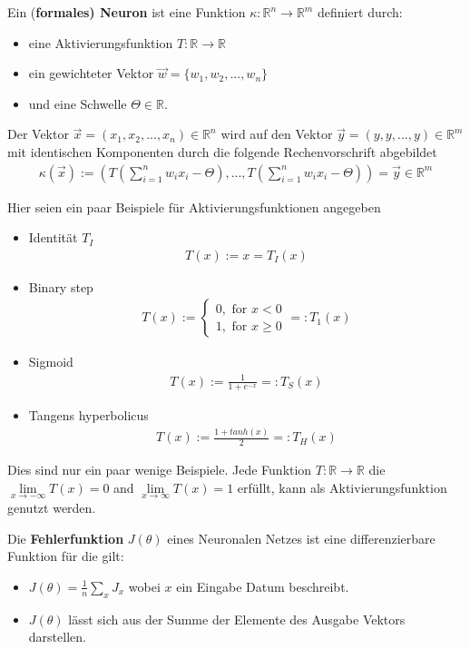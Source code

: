 \begin{definition} \label{Def:formales Neuron}
\cite[Kapitel 1.2]{BurkhardLenze.1997} Ein (\textbf{formales) Neuron} ist eine Funktion $\kappa: \mathbb{R}^n \rightarrow \mathbb{R}^m$ definiert durch:
\begin{itemize}
\item eine Aktivierungsfunktion $T:\mathbb{R} \rightarrow \mathbb{R}$
\item ein gewichteter Vektor $\vec{w} = \{w_1,w_2,...,w_n\}$
\item und eine Schwelle  $\Theta\in\mathbb{R}$.
\end{itemize}
Der Vektor $\vec{x} = (x_1,x_2,...,x_n)\in \mathbb{R}^n$ wird auf den Vektor $\vec{y} = (y,y,...,y)\in \mathbb{R}^m$ mit identischen Komponenten durch die folgende Rechenvorschrift abgebildet
\begin{align}
\kappa(\vec{x}):= (T(\sum\limits_{i=1}^n w_i x_i - \Theta),...,T(\sum\limits_{i=1}^n w_i x_i - \Theta))=\vec{y} \in \mathbb{R}^m
\end{align}   
\end{definition}
Hier seien ein paar Beispiele für Aktivierungsfunktionen angegeben
\begin{itemize}
\item Identität $T_I$
\begin{align*}
T(x):=x=T_I(x)
\end{align*}
\item Binary step
\begin{align*}
T(x) := \begin{cases} 0, \text{ for } x < 0 \\ 1, \text{ for } x \geq 0 \end{cases} =: T_1 (x)
\end{align*}
\item Sigmoid
\begin{align*}
T(x) := \frac{1}{1+e^{-x}} =: T_S(x)
\end{align*}
\item Tangens hyperbolicus
\begin{align*}
T(x) := \frac{1+tanh(x)}{2} =: T_H(x)
\end{align*}
\end{itemize}
Dies sind nur ein paar wenige Beispiele.
Jede Funktion $T:\mathbb{R}\rightarrow \mathbb{R}$
die $\lim\limits_{x \rightarrow -\infty}{T(x)}=0$ 
and $\lim\limits_{x \rightarrow \infty}{T(x)}=1$ erfüllt,
kann als Aktivierungsfunktion genutzt werden.

\begin{definition}
    \cite[Kapitel 2]{MichaelNielsen.Juni2019}
    Die \textbf{Fehlerfunktion} $J(\theta)$ eines Neuronalen Netzes ist eine 
    differenzierbare Funktion für die gilt:
    \begin{itemize}
        \item $J(\theta) = \frac{1}{n} \sum_x J_x$ wobei $x$ ein Eingabe Datum
        beschreibt.
        \item $J(\theta)$ lässt sich aus der Summe der Elemente des Ausgabe Vektors
        darstellen.
    \end{itemize}
\end{definition}

